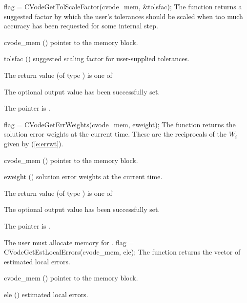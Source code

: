 {
  flag = CVodeGetTolScaleFactor(cvode\_mem, \&tolsfac);
}
{
  The function  returns a
  suggested factor by which the user's tolerances 
  should be scaled when too much accuracy has been 
  requested for some internal step.
}
{
  \begin{args}
  \item[cvode\_mem] ()
    pointer to the {\cvodes} memory block.
  \item[tolsfac] ()
    suggested scaling factor for user-supplied tolerances.
  \end{args}
}
{
  The return value  (of type ) is one of
  \begin{args}
  \item[\Id{CV\_SUCCESS}] 
    The optional output value has been successfully set.
  \item[\Id{CV\_MEM\_NULL}]
    The  pointer is .
  \end{args}
}
{}
{
  flag = CVodeGetErrWeights(cvode\_mem, eweight);
}
{
  The function  returns the solution error weights 
  at the current time. These are the reciprocals of the $W_i$ given by (\ref{e:errwt}).
}
{
  \begin{args}
  \item[cvode\_mem] ()
    pointer to the {\cvodes} memory block.
  \item[eweight] ()
    solution error weights at the current time.
  \end{args}
}
{
  The return value  (of type ) is one of
  \begin{args}
  \item[\Id{CV\_SUCCESS}] 
    The optional output value has been successfully set.
  \item[\Id{CV\_MEM\_NULL}]
    The  pointer is .
  \end{args}
}
{
  {\warn} The user must allocate memory for .
}
{
  flag = CVodeGetEstLocalErrors(cvode\_mem, ele);
}
{
  The function  returns the
  vector of estimated local errors.
}
{
  \begin{args}
  \item[cvode\_mem] ()
    pointer to the {\cvodes} memory block.
  \item[ele] ()
    estimated local errors.
  \end{args}
}
